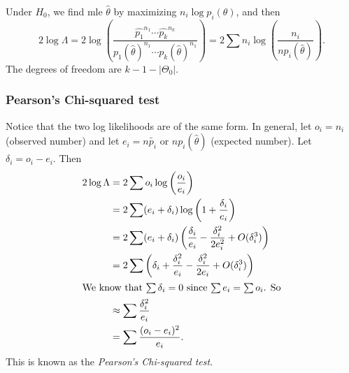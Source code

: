\documentclass[a4paper]{article}
\begin{document}
Under $H_0$, we find mle $\hat{\theta}$ by maximizing $n_i \log p_i (\theta)$, and then
\[
  2\log \Lambda = 2\log \left(\frac{\hat{p_1}^{n_1}\cdots \hat{p_k}^{n_k}}{p_1(\hat{\theta})^{n_1}\cdots p_k (\hat{\theta})^{n_1}}\right) = 2\sum n_i \log \left(\frac{n_i}{np_i(\hat{\theta})}\right).\tag{2}
\]
The degrees of freedom are $k - 1 - |\Theta_0|$.

\subsubsection{Pearson's Chi-squared test}
Notice that the two log likelihoods are of the same form. In general, let $o_i = n_i$ (observed number) and let $e_i = n\tilde{p_i}$ or $np_i(\hat{\theta})$ (expected number). Let $\delta_i = o_i - e_i$. Then
\begin{align*}
  2\log \Lambda &= 2\sum o_i \log \left(\frac{o_i}{e_i}\right)\\
  &= 2\sum (e_i + \delta_i) \log\left(1 + \frac{\delta_i}{e_i}\right)\\
  &= 2\sum (e_i + \delta_i) \left(\frac{\delta_i}{e_i} - \frac{\delta_i^2}{2e_i^2} + O(\delta_i^3)\right)\\
  &= 2\sum \left(\delta_i + \frac{\delta_i^2}{e_i} - \frac{\delta_i^2}{2e_i} + O(\delta_i^3)\right)\\
  \intertext{We know that $\sum \delta_i = 0$ since $\sum e_i = \sum o_i$. So}
  &\approx \sum \frac{\delta_i^2}{e_i}\\
  &= \sum\frac{(o_i - e_i)^2}{e_i}.
\end{align*}
This is known as the \emph{Pearson's Chi-squared test}.
\end{document}

